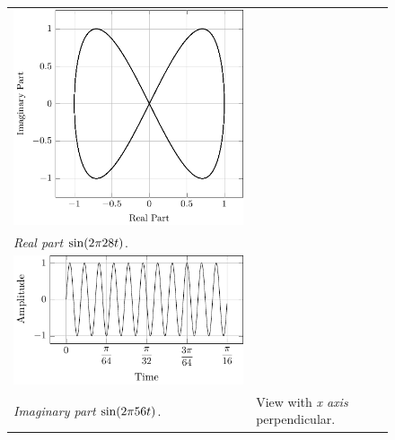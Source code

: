 \documentclass[../../course]{subfiles}
\begin{document}
\begin{figure} [H]
\begin{NiceTabularX} {\textwidth} {
            *{2}{>{\centering\arraybackslash}X}
        }
         {
             {
                \includegraphics[height = \textheight] {tikzpics/plotFrontViewComplexB.pdf}
            }
        }

        \\

         {\emph{Real part} $\sin(2 \pi 28 t)$.}
        \label{plt:realCmplxB}

        &
        \\

         {
             {
                \includegraphics[height = \textheight] {tikzpics/plotShortX2.pdf}
            }
        }

        &
        \\

         {\emph{Imaginary part} $\sin(2 \pi 56 t)$.}
        \label{plt:imagCmplxB}

        &

         {View with \emph{x axis} perpendicular.}
        \label{plt:frontViewCmplxB}

        \\

    \end{NiceTabularX}

\end{figure}
\end{document}
